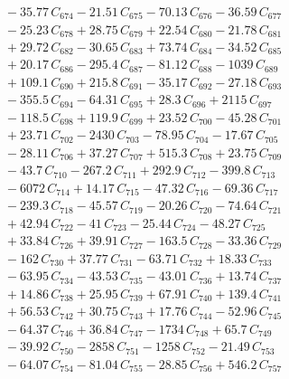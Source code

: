 \documentclass[a4paper,11pt]{article}
\begin{document}
\begin{align}
&\quad - 35.77\,C_{674} - 21.51\,C_{675} - 70.13\,C_{676} - 36.59\,C_{677} \nonumber\\
&\quad - 25.23\,C_{678} + 28.75\,C_{679} + 22.54\,C_{680} - 21.78\,C_{681} \nonumber\\
&\quad + 29.72\,C_{682} - 30.65\,C_{683} + 73.74\,C_{684} - 34.52\,C_{685} \nonumber\\
&\quad + 20.17\,C_{686} - 295.4\,C_{687} - 81.12\,C_{688} - 1039\,C_{689} \nonumber\\
&\quad + 109.1\,C_{690} + 215.8\,C_{691} - 35.17\,C_{692} - 27.18\,C_{693} \nonumber\\
&\quad - 355.5\,C_{694} - 64.31\,C_{695} + 28.3\,C_{696} + 2115\,C_{697} \nonumber\\
&\quad - 118.5\,C_{698} + 119.9\,C_{699} + 23.52\,C_{700} - 45.28\,C_{701} \nonumber\\
&\quad + 23.71\,C_{702} - 2430\,C_{703} - 78.95\,C_{704} - 17.67\,C_{705} \nonumber\\
&\quad - 28.11\,C_{706} + 37.27\,C_{707} + 515.3\,C_{708} + 23.75\,C_{709} \nonumber\\
&\quad - 43.7\,C_{710} - 267.2\,C_{711} + 292.9\,C_{712} - 399.8\,C_{713} \nonumber\\
&\quad - 6072\,C_{714} + 14.17\,C_{715} - 47.32\,C_{716} - 69.36\,C_{717} \nonumber\\
&\quad - 239.3\,C_{718} - 45.57\,C_{719} - 20.26\,C_{720} - 74.64\,C_{721} \nonumber\\
&\quad + 42.94\,C_{722} - 41\,C_{723} - 25.44\,C_{724} - 48.27\,C_{725} \nonumber\\
&\quad + 33.84\,C_{726} + 39.91\,C_{727} - 163.5\,C_{728} - 33.36\,C_{729} \nonumber\\
&\quad - 162\,C_{730} + 37.77\,C_{731} - 63.71\,C_{732} + 18.33\,C_{733} \nonumber\\
&\quad - 63.95\,C_{734} - 43.53\,C_{735} - 43.01\,C_{736} + 13.74\,C_{737} \nonumber\\
&\quad + 14.86\,C_{738} + 25.95\,C_{739} + 67.91\,C_{740} + 139.4\,C_{741} \nonumber\\
&\quad + 56.53\,C_{742} + 30.75\,C_{743} + 17.76\,C_{744} - 52.96\,C_{745} \nonumber\\
&\quad - 64.37\,C_{746} + 36.84\,C_{747} - 1734\,C_{748} + 65.7\,C_{749} \nonumber\\
&\quad - 39.92\,C_{750} - 2858\,C_{751} - 1258\,C_{752} - 21.49\,C_{753} \nonumber\\
&\quad - 64.07\,C_{754} - 81.04\,C_{755} - 28.85\,C_{756} + 546.2\,C_{757} \nonumber\\

\end{align}
\end{document}
